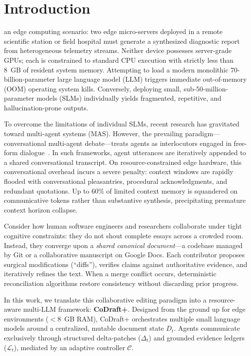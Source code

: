 \documentclass[10pt,journal,compsoc]{IEEEtran}
\begin{document}
\maketitle
\IEEEdisplaynontitleabstractindextext
\IEEEpeerreviewmaketitle

\section{Introduction}
 an edge computing scenario: two edge micro-servers deployed in a remote scientific station or field hospital must generate a synthesized diagnostic report from heterogeneous telemetry streams. Neither device possesses server-grade GPUs; each is constrained to standard CPU execution with strictly less than 8~GB of resident system memory. Attempting to load a modern monolithic 70-billion-parameter large language model (LLM) triggers immediate out-of-memory (OOM) operating system kills. Conversely, deploying small, sub-50-million-parameter models (SLMs) individually yields fragmented, repetitive, and hallucination-prone outputs.

To overcome the limitations of individual SLMs, recent research has gravitated toward multi-agent systems (MAS). However, the prevailing paradigm---conversational multi-agent debate---treats agents as interlocutors engaged in free-form dialogue~\cite{du2024improving,liang2024encouraging}. In such frameworks, agent utterances are iteratively appended to a shared conversational transcript. On resource-constrained edge hardware, this conversational overhead incurs a severe penalty: context windows are rapidly flooded with conversational pleasantries, procedural acknowledgments, and redundant quotations. Up to 60\% of limited context memory is squandered on communicative tokens rather than substantive synthesis, precipitating premature context horizon collapse.

Consider how human software engineers and researchers collaborate under tight cognitive constraints: they do not shout complete essays across a crowded room. Instead, they converge upon a \emph{shared canonical document}---a codebase managed by Git or a collaborative manuscript on Google Docs. Each contributor proposes surgical modifications (``diffs''), verifies claims against authoritative evidence, and iteratively refines the text. When a merge conflict occurs, deterministic reconciliation algorithms restore consistency without discarding prior progress.

In this work, we translate this collaborative editing paradigm into a resource-aware multi-LLM framework: \textbf{CoDraft+}. Designed from the ground up for edge environments ($<8$~GB RAM), CoDraft+ orchestrates multiple small language models around a centralized, mutable document state $D_t$. Agents communicate exclusively through structured delta-patches ($\Delta_t$) and grounded evidence ledgers ($\mathcal{L}_t$), mediated by an adaptive controller $\mathcal{C}$.
\end{document}
